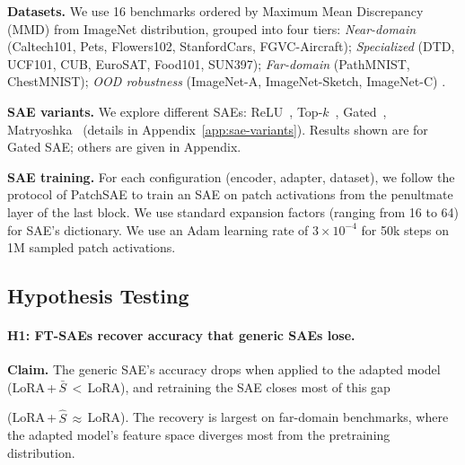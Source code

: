 \textbf{Datasets.}
We use 16 benchmarks ordered by Maximum Mean Discrepancy (MMD) from ImageNet distribution,
grouped into four tiers:
\emph{Near-domain} (Caltech101, Pets, Flowers102, StanfordCars, FGVC-Aircraft);
\emph{Specialized} (DTD, UCF101, CUB, EuroSAT, Food101, SUN397);
\emph{Far-domain} (PathMNIST, ChestMNIST);
\emph{OOD robustness} (ImageNet-A, ImageNet-Sketch, ImageNet-C)
\citep{fei2004caltech,parkhi2012cats,nilsback2008automated,krause2013collecting,
maji2013fine,cimpoi2013describing,soomro2012ucf101,helber2019eurosat,
bossard2014food,xiao2010sun,yang2023medmnist,irvin2019chexpert,
hendrycks2021natural,wang2019learning,hendrycks2019benchmarking}.

\noindent\textbf{SAE variants.}
We explore different SAEs: ReLU~\citep{cunningham2024sparse}, Top-$k$~\citep{gao2025scaling}, Gated~\citep{rajamanoharan2024improving}, Matryoshka~\citep{bussmann2025matryoshka,zaremba2025msae} (details in Appendix~\ref{app:sae-variants}). Results shown are for Gated SAE; others are given in Appendix.

\textbf{SAE training.}
For each configuration (encoder, adapter, dataset), we follow the protocol of PatchSAE to train an SAE on patch activations from the penultmate layer of the last block. We use standard expansion factors (ranging from 16 to 64) for SAE's dictionary. We use an Adam learning rate of $3{\times}10^{-4}$ for 50k steps on 1M sampled patch activations.

\vspace{-6pt}
\subsection{Hypothesis Testing}
\label{sec:exp:hypotheses}
\vspace{-5pt}

\paragraph{H1: FT-SAEs recover accuracy that generic SAEs lose.}
\label{sec:exp:h1}

\textbf{Claim.}
The generic SAE's accuracy drops when applied to the adapted model
(LoRA\,+\,$\bar{S}$\,$<$\,LoRA),
and retraining the SAE closes most of this gap




(LoRA\,+\,$\hat{S}$\,$\approx$\,LoRA).
The recovery is largest on far-domain benchmarks, where the adapted model's
feature space diverges most from the pretraining distribution.

